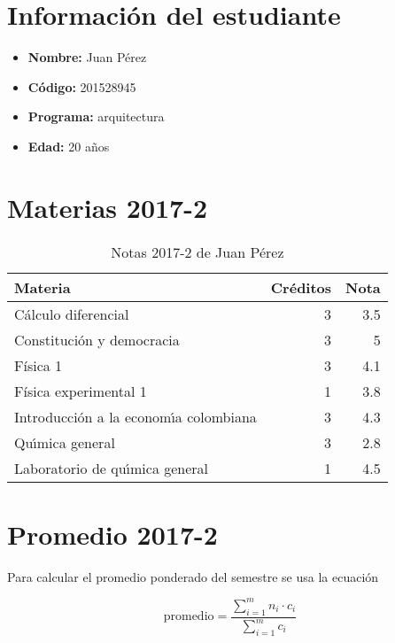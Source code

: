 \documentclass[letterpaper]{article}
\begin{document}
\section{Informaci\'on del estudiante}


\begin{itemize}
  \item {\bf Nombre:} Juan P\'erez
  \item {\bf C\'odigo:} 201528945
  \item {\bf Programa:} arquitectura
  \item {\bf Edad:} 20 a\~nos
\end{itemize}

\section{Materias 2017-2}

\begin{table}[h!] %
 
\begin{tabular}{|l|r|r|}
 \hline
 Materia & Cr\'editos & Nota \\
 \hline
 C\'alculo diferencial & 3 & 3.5\\
 Constituci\'on y democracia & 3 & 5\\
 F\'isica 1 & 3 & 4.1\\
 F\'isica experimental 1 & 1 & 3.8\\
 Introducci\'on a la econom\'{\i}a colombiana & 3 & 4.3\\
 Qu\'{\i}mica general & 3 & 2.8\\
 Laboratorio de qu\'{\i}mica general & 1 & 4.5\\
 \hline
\end{tabular}
\caption[]{Notas 2017-2 de Juan P\'erez}\label{tab:notas}
\end{table}

\section{Promedio 2017-2}


Para calcular el promedio ponderado del semestre se usa la ecuaci\'on

\begin{equation}
  \textrm{promedio} = \frac{\sum_{i=1}^m n_i \cdot c_i}{\sum_{i=1}^m c_i}
\end{equation}
\end{document}
